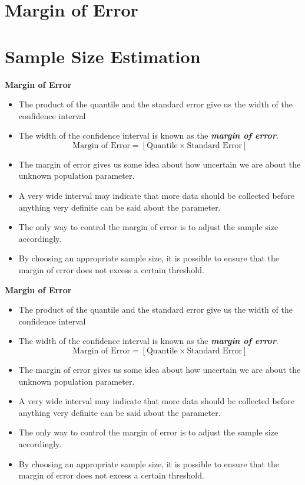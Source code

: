 \documentclass[]{report}
\begin{document}
\newpage

\section{Margin of Error}


\section{Sample Size Estimation}

\textbf{Margin of Error}

\begin{itemize}
\item The product of the quantile and the standard error give us the width of the confidence interval
\item The width of the confidence interval is known as the \textbf{\emph{margin of error}}.  \[ \mbox{Margin of Error}  = \left[ \mbox{Quantile} \times \mbox{Standard Error} \right] \]
\item The margin of error gives us some idea about how uncertain we are about the unknown population parameter. \item A very wide interval may indicate that more data should be collected before anything very definite can be said about the parameter.
\item The only way to control the margin of error is to adjust the sample size accordingly.
\item By choosing an appropriate sample size, it is possible to ensure that the margin of error does not excess a certain threshold.
\end{itemize}
\newpage

\textbf{Margin of Error}

\begin{itemize}
\item The product of the quantile and the standard error give us the width of the confidence interval
\item The width of the confidence interval is known as the \textbf{\emph{margin of error}}.  \[ \mbox{Margin of Error}  = \left[ \mbox{Quantile} \times \mbox{Standard Error} \right] \]
\item The margin of error gives us some idea about how uncertain we are about the unknown population parameter. \item A very wide interval may indicate that more data should be collected before anything very definite can be said about the parameter.
\item The only way to control the margin of error is to adjust the sample size accordingly.
\item By choosing an appropriate sample size, it is possible to ensure that the margin of error does not excess a certain threshold.
\end{itemize}
\end{document}
